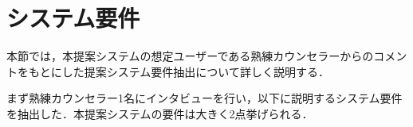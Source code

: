 \documentclass[shuuron]{kuee}
\begin{document}
%
%





\section{システム要件}

本節では，本提案システムの想定ユーザーである熟練カウンセラーからのコメントをもとにした提案システム要件抽出について詳しく説明する．


まず熟練カウンセラー1名にインタビューを行い，以下に説明するシステム要件を抽出した．本提案システムの要件は大きく2点挙げられる．
\end{document}
